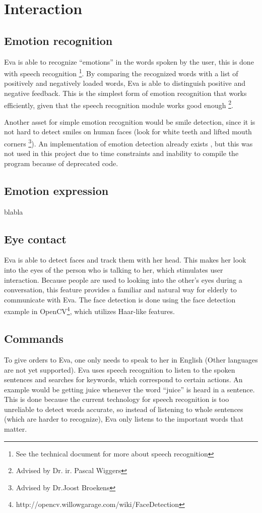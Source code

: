 \documentclass[project_eva.tex]{subfiles}
\begin{document}
\section*{Interaction}

\subsection*{Emotion recognition}
Eva is able to recognize ``emotions'' in the words spoken by the user, this is done with speech recognition \footnote{See 
the technical document for more about speech recognition}. By comparing the recognized words with a list of positively and 
negatively loaded words, Eva is able to distinguish positive and negative feedback. This is the simplest form of emotion 
recognition that works efficiently, given that the speech recognition module works good enough \footnote{Advised by Dr. ir. 
Pascal Wiggers}. 

Another asset for simple emotion recognition would be smile detection, since it is not hard to detect smiles on human faces 
(look for white teeth and lifted mouth corners \footnote{Advised by Dr.Joost Broekens}). An implementation of emotion 
detection already exists \cite{autosmiley}, but this was not used in this project due to time 
constraints and inability to compile the program because of deprecated code.
 
\subsection*{Emotion expression}
blabla 

\subsection*{Eye contact}
Eva is able to detect faces and track them with her head. This makes her look into the eyes of the person who is talking to 
her, which stimulates user interaction. Because people are used to looking into the other's eyes during a conversation, 
this feature provides a familiar and natural way for elderly to communicate with Eva. The face detection is done using the face detection example in OpenCV\footnote{http://opencv.willowgarage.com/wiki/FaceDetection}, which utilizes Haar-like features.

\subsection*{Commands}
To give orders to Eva, one only needs to speak to her in English (Other languages are not yet supported). Eva uses speech 
recognition to listen to the spoken sentences and searches for keywords, which correspond to certain actions. An example 
would be getting juice whenever the word ``juice'' is heard in a sentence. This is done because the current technology for 
speech recognition is too unreliable to detect words accurate, so instead of listening to whole sentences (which are harder 
to recognize), Eva only listens to the important words that matter.
\end{document}
